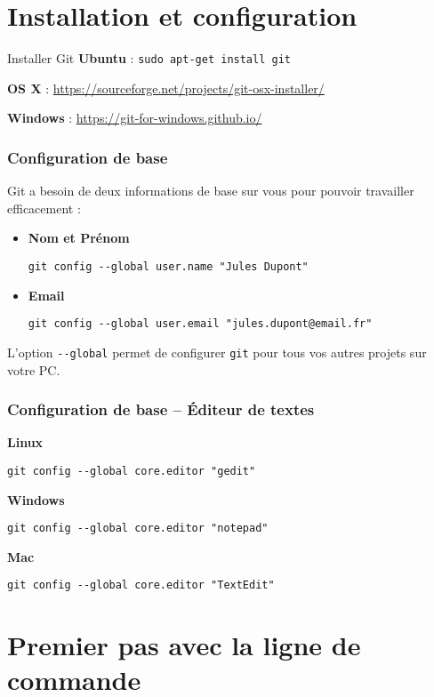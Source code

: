 \documentclass{beamer}
\begin{document}
\section{Installation et configuration}
\begin{frame}{Installer Git}
\textbf{Ubuntu} : \lstinline{sudo apt-get install git}

\textbf{OS X} : \url{https://sourceforge.net/projects/git-osx-installer/}

\textbf{Windows} : \url{https://git-for-windows.github.io/}
\end{frame}

\begin{frame}[fragile]
\frametitle{Configuration de base}

Git a besoin de deux informations de base sur vous pour pouvoir travailler efficacement :

\begin{itemize}
\item \textbf{Nom et Prénom}
\begin{lstlisting}
git config --global user.name "Jules Dupont"
\end{lstlisting}

\item \textbf{Email}
\begin{lstlisting}
git config --global user.email "jules.dupont@email.fr"
\end{lstlisting}
\end{itemize}

L'option \lstinline{--global} permet de configurer \texttt{git} pour tous vos autres projets sur votre PC.
\end{frame}

\begin{frame}[fragile]
\frametitle{Configuration de base -- Éditeur de textes}
\textbf{Linux}\begin{lstlisting}
git config --global core.editor "gedit"
\end{lstlisting}\textbf{Windows}\begin{lstlisting}
git config --global core.editor "notepad"
\end{lstlisting}
\textbf{Mac}\begin{lstlisting}
git config --global core.editor "TextEdit"
\end{lstlisting}
\end{frame}

\section{Premier pas avec la ligne de commande}
\end{document}
